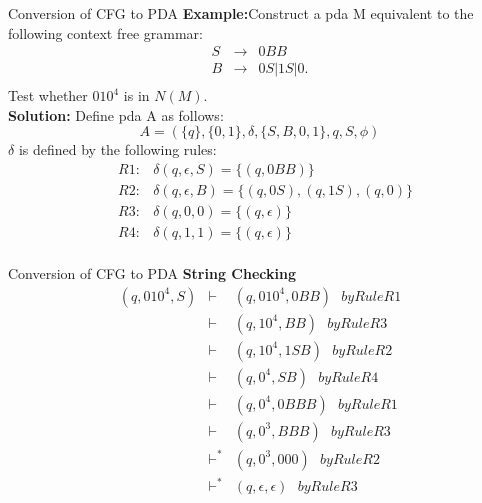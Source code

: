 \documentclass{beamer}
\begin{document}
\begin{frame}{Conversion of CFG to PDA}
	\textbf{Example:}Construct a pda M equivalent to the following context free grammar:
	\begin{eqnarray*}
		S&\rightarrow&0BB\\
		B&\rightarrow&0S|1S|0.
\\
	\end{eqnarray*}
Test whether $010^4$ is in $N(M)$.\\
\textbf{Solution:}
Define pda A as follows:
$$A=(\{q\},\{0,1\}, \delta,\{S,B,0,1\},q, S, \phi)$$
$\delta$ is defined by the following rules:
\begin{eqnarray*}
	&R1:& \delta(q, \epsilon, S)=\{(q,0BB)\}\\
	&R2:& \delta(q, \epsilon, B)=\{(q,0S),(q,1S),(q,0)\}\\
	&R3:& \delta(q, 0,0)=\{( q, \epsilon)\}\\
	&R4:& \delta(q, 1,1)=\{( q, \epsilon)\}\\
\end{eqnarray*}
\end{frame}
\begin{frame}{Conversion of CFG to PDA}
	\textbf{String Checking }
	\begin{eqnarray*}
		(q,010^4,S) 
		&\vdash& (q, 010^4, 0BB) \ \ \ by Rule R1 \\
		&\vdash& (q, 10^4, BB) \ \ \ by Rule R3 \\
		&\vdash& (q, 10^4,1SB) \ \ \ by Rule R2 \\
		&\vdash& (q, 0^4, SB) \ \ \ by Rule R4 \\ 
		&\vdash& (q, 0^4, 0BBB) \ \ \ by Rule R1 \\
		&\vdash& (q, 0^3,BBB) \ \ \ by Rule R3 \\
		&\vdash^*&(q, 0^3,000) \ \ \ by Rule R2 \\ 
		&\vdash^*&(q, \epsilon , \epsilon)  \ \ \ by Rule R3 \\ 
	\end{eqnarray*}
\end{frame}
\end{document}
